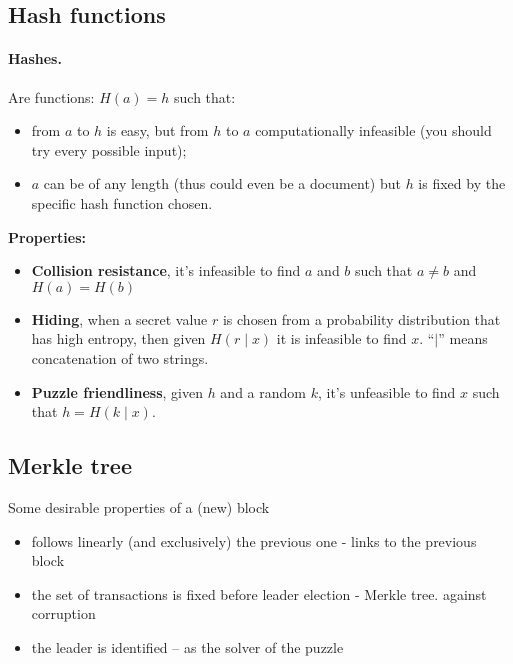 \subsection{Hash functions}

\paragraph*{Hashes.} Are functions: $H(a)=h$ such that:
\begin{itemize}
	\item from $a$ to $h$ is easy, but from $h$ to $a$ computationally infeasible (you should try every possible input);
	\item $a$ can be of any length (thus could even be a document) but $h$ is fixed by the specific hash function chosen.
\end{itemize}

\textbf{Properties:}
\begin{itemize}
	\item \textbf{Collision resistance}, it's infeasible to find $a$ and $b$ such that $a\neq b$ and $H(a)=H(b)$
	\item \textbf{Hiding}, when a secret value $r$ is chosen from a probability distribution that has high entropy, then given $H(r\mid x)$ it is infeasible to find $x$. ``$\mid$'' means concatenation of two strings.
	\item \textbf{Puzzle friendliness}, given $h$ and a random $k$, it's unfeasible to find $x$ such that $h=H(k\mid x)$.
\end{itemize}

\subsection{Merkle tree}

Some desirable properties of a (new) block
\begin{itemize}
	\item follows linearly (and exclusively) the previous one - links to the previous block
	\item the set of transactions is fixed before leader election - Merkle tree. against corruption
	\item the leader is identified – as the solver of the puzzle
\end{itemize}

